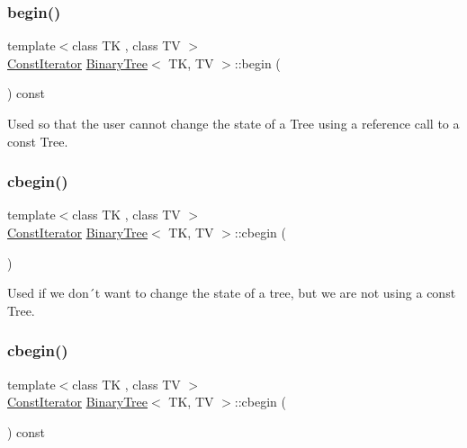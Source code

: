 \subsubsection{\texorpdfstring{begin()}{begin()}\hspace{0.1cm}{\footnotesize\ttfamily [2/2]}}
{\footnotesize\ttfamily template$<$class TK , class TV $>$ \\
\mbox{\hyperlink{classBinaryTree_1_1ConstIterator}{Const\+Iterator}} \mbox{\hyperlink{classBinaryTree}{Binary\+Tree}}$<$ TK, TV $>$\+::begin (\begin{DoxyParamCaption}{ }\end{DoxyParamCaption}) const\hspace{0.3cm}{\ttfamily [inline]}}

Used so that the user cannot change the state of a Tree using a reference call to a const Tree. \mbox{\label{classBinaryTree_afc1bfd2d748acb391605ffcf8c86439d}} 
\subsubsection{\texorpdfstring{cbegin()}{cbegin()}\hspace{0.1cm}{\footnotesize\ttfamily [1/2]}}
{\footnotesize\ttfamily template$<$class TK , class TV $>$ \\
\mbox{\hyperlink{classBinaryTree_1_1ConstIterator}{Const\+Iterator}} \mbox{\hyperlink{classBinaryTree}{Binary\+Tree}}$<$ TK, TV $>$\+::cbegin (\begin{DoxyParamCaption}{ }\end{DoxyParamCaption})\hspace{0.3cm}{\ttfamily [inline]}}

Used if we don´t want to change the state of a tree, but we are not using a const Tree. \mbox{\label{classBinaryTree_a70ad506f00c666f7e3b26f78e66709c7}} 
\subsubsection{\texorpdfstring{cbegin()}{cbegin()}\hspace{0.1cm}{\footnotesize\ttfamily [2/2]}}
{\footnotesize\ttfamily template$<$class TK , class TV $>$ \\
\mbox{\hyperlink{classBinaryTree_1_1ConstIterator}{Const\+Iterator}} \mbox{\hyperlink{classBinaryTree}{Binary\+Tree}}$<$ TK, TV $>$\+::cbegin (\begin{DoxyParamCaption}{ }\end{DoxyParamCaption}) const\hspace{0.3cm}{\ttfamily [inline]}}

